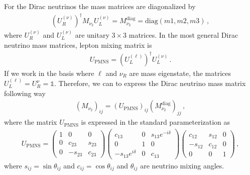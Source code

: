 \documentclass[12pt]{article}
\begin{document}
For the Dirac neutrinos the mass matrices are diagonalized by
\begin{align}
(U^{(\nu)}_R)^{\dagger} M_{\nu_{2}} U^{(\nu)}_L = M_{\nu_{2}}^{\text{diag}} = \text{diag}(m1, m2, m3)\,,
\end{align}
where $U^{(\nu)}_R$ and $U^{(\nu)}_L$  are unitary $3 \times 3$ matrices. In the most general Dirac neutrino mass matrices, lepton mixing matrix is
\begin{align}
U_{\text{PMNS}} = (U^{(\ell)}_L)^{\dagger} U^{(\nu)}_L\,.
\end{align}
If we work in the basis where $\ell$ and $\nu_{R}$ are mass eigenstate, the matrices $U_{L}^{(\ell)} = U_{R}^{\nu} = \mathds{1}$. Therefore, we can to express the Dirac neutrino mass matrix following way
\begin{align}
(M_{\nu_{2}})_{ij} = (U_{\text{PMNS}})_{ij} (M_{\nu_{2}}^{\text{diag}})_{jj}\,,
\end{align}
where the matrix $U_{\text{PMNS}}$ is expressed in the standard parameterization as
\begin{align}
U_{\text{PMNS}} = \begin{pmatrix}
    1 & 0		& 0 \\
    0 & c_{23}  & s_{23} \\
    0 & -s_{23} & c_{23}
\end{pmatrix}
\begin{pmatrix}
    c_{13}  &  0 & s_{13}e^{-i\delta} \\
    0 		&  1 & 0 \\
    -s_{13}e^{i\delta} &  0 & c_{13}
\end{pmatrix}
\begin{pmatrix}
    c_{12}  & s_{12} & 0 \\
    -s_{12} & c_{12} & 0 \\
    0		& 0		 & 1
\end{pmatrix}\,,
\end{align}
where $s_{ij} = \sin \theta_{ij}$ and $c_{ij} = \cos \theta_{ij}$ and $\theta_{ij}$ are neutrino mixing angles.
\end{document}

